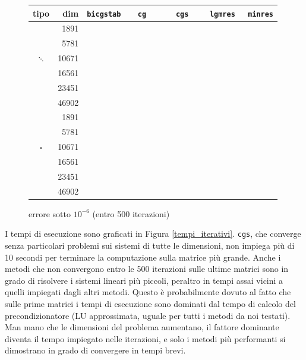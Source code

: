 \documentclass[11pt,a4paper]{scrartcl}
\newcommand{\yep}{\ding{51}}%
\newcommand{\nope}{\ding{55}}%
\begin{document}
\begin{figure}[!ht]
\centering
\begin{tabular}{cr|ccccc}
\toprule
tipo & dim & \verb|bicgstab| & \verb|  cg   | & \verb|  cgs  | & \verb| lgmres| & \verb| minres| \\
\midrule
\multirow{5}{*}{$\ddots$} & {1891} & \yep & \yep & \yep & \yep & \yep \\
& {5781} & \yep & \yep & \yep & \yep & \yep \\
& {10671} & \yep & \yep & \yep & \yep & \yep \\
& {16561} & \yep & \yep  & \yep & \yep & \nope \\
& {23451} & \yep & \nope & \yep & \yep & \nope \\
& {46902} & \nope & \nope & \yep & \yep & \nope \\ 
\midrule
\multirow{5}{*}{$\square$} & {1891} & \yep & \yep & \yep & \yep & \yep \\
& {5781} & \yep & \yep & \yep & \yep & \yep \\
& {10671} & \yep & \yep & \yep & \yep & \yep \\
& {16561} & \yep & \yep  & \yep & \yep & \nope \\
& {23451} & \yep & \nope & \yep & \yep & \nope \\
& {46902} & \yep & \nope & \yep & \yep & \nope \\ 
\bottomrule
\end{tabular}
\caption{errore sotto $10^{-6}$ (entro 500 iterazioni)}
\label{tabella2}
\end{figure}

I tempi di esecuzione sono graficati in Figura \ref{tempi_iterativi}. \texttt{cgs}, che converge senza particolari problemi sui sistemi di tutte le dimensioni, non impiega più di 10 secondi per terminare la computazione sulla matrice più grande. Anche i metodi che non convergono entro le 500 iterazioni sulle ultime matrici sono in grado di risolvere i sistemi lineari più piccoli, peraltro in tempi assai vicini a quelli impiegati dagli altri metodi. Questo è probabilmente dovuto al fatto che sulle prime matrici i tempi di esecuzione sono dominati dal tempo di calcolo del precondizionatore (LU approssimata, uguale per tutti i metodi da noi testati). Man mano che le dimensioni del problema aumentano, il fattore dominante diventa il tempo impiegato nelle iterazioni, e solo i metodi più performanti si dimostrano in grado di convergere in tempi brevi. 
\end{document}
